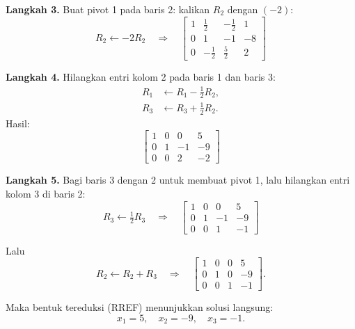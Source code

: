 \documentclass[12pt]{article}
\begin{document}
\textbf{Langkah 3.} Buat pivot 1 pada baris 2: kalikan $R_2$ dengan $(-2)$:
\[
R_2 \leftarrow -2R_2
\quad\Rightarrow\quad
\left[\begin{array}{ccc|c}
1 & \tfrac{1}{2} & -\tfrac{1}{2} & 1 \\[4pt]
0 & 1 & -1 & -8 \\[4pt]
0 & -\tfrac{1}{2} & \tfrac{5}{2} & 2
\end{array}\right]
\]

\textbf{Langkah 4.} Hilangkan entri kolom 2 pada baris 1 dan baris 3:
\[
\begin{aligned}
R_1 &\leftarrow R_1 - \tfrac{1}{2} R_2,\\
R_3 &\leftarrow R_3 + \tfrac{1}{2} R_2.
\end{aligned}
\]
Hasil:
\[
\left[\begin{array}{ccc|c}
1 & 0 & 0 & 5 \\[4pt]
0 & 1 & -1 & -9 \\[4pt]
0 & 0 & 2 & -2
\end{array}\right]
\]

\textbf{Langkah 5.} Bagi baris 3 dengan 2 untuk membuat pivot 1, lalu hilangkan entri kolom 3 di baris 2:
\[
R_3 \leftarrow \tfrac{1}{2}R_3 \quad\Rightarrow\quad
\left[\begin{array}{ccc|c}
1 & 0 & 0 & 5 \\[4pt]
0 & 1 & -1 & -9 \\[4pt]
0 & 0 & 1 & -1
\end{array}\right]
\]

Lalu
\[
R_2 \leftarrow R_2 + R_3
\quad\Rightarrow\quad
\left[\begin{array}{ccc|c}
1 & 0 & 0 & 5 \\[4pt]
0 & 1 & 0 & -9 \\[4pt]
0 & 0 & 1 & -1
\end{array}\right].
\]

Maka bentuk tereduksi (RREF) menunjukkan solusi langsung:
\[
x_1 = 5,\quad x_2 = -9,\quad x_3 = -1.
\]
\end{document}

